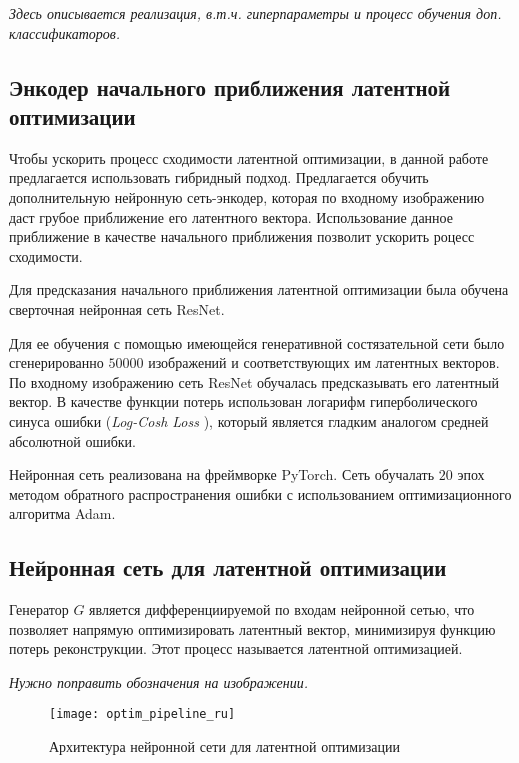 \emph{Здесь описывается реализация, в.т.ч. гиперпараметры и процесс обучения доп. классификаторов.}

\subsection{Энкодер начального приближения латентной оптимизации}
Чтобы ускорить процесс сходимости латентной оптимизации, в данной работе предлагается использовать гибридный подход. Предлагается обучить дополнительную нейронную сеть-энкодер, которая по входному изображению даст грубое приближение его латентного вектора. Использование данное приближение в качестве начального приближения позволит ускорить роцесс сходимости.

Для предсказания начального приближения латентной оптимизации была обучена сверточная нейронная сеть ResNet.

Для ее обучения с помощью имеющейся генеративной состязательной сети было сгенерированно $50000$ изображений и соответствующих им латентных векторов.
По входному изображению сеть ResNet обучалась предсказывать его латентный вектор. В качестве функции потерь использован логарифм гиперболического синуса ошибки (\emph{Log-Cosh Loss} \cite{chen2019log}), который является гладким аналогом средней абсолютной ошибки.

Нейронная сеть реализована на  фреймворке PyTorch. Сеть обучалать $20$ эпох методом обратного распространения ошибки с использованием оптимизационного алгоритма Adam.

\subsection{Нейронная сеть для латентной оптимизации}

Генератор $G$ является дифференциируемой по входам нейронной сетью, что позволяет напрямую оптимизировать латентный вектор, минимизируя функцию потерь реконструкции. Этот процесс называется латентной оптимизацией. 

\emph{Нужно поправить обозначения на изображении.}
\begin{figure}[h]
\begin{center}
    \texttt{[image: optim\_pipeline\_ru]}
    \caption{Архитектура нейронной сети для латентной оптимизации}
    \label{fig:optim_pipelin}
\end{center}
\end{figure}

